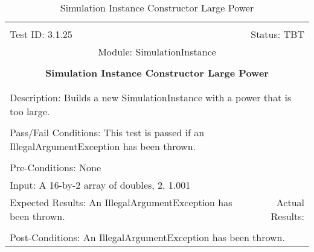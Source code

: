 \documentclass[titlepage]{article}
\begin{document}
\begin{center}%
\begin{table}
\begin{tabular}{|l r|}\hline&\\[-2mm]
	Test ID: 3.1.25	&Status: TBT\\[-3mm]
	\multicolumn{2}{|c|}{Module: SimulationInstance}\\&\\
	\multicolumn{2}{|c|}{\textbf{\large{Simulation Instance Constructor Large Power}}}\\&\\\hline&\\[-3mm]
	\multicolumn{2}{|p{\textwidth}|}{Description: Builds a new SimulationInstance with a power that is too large.}\\[1mm]\hline&\\[-3mm]
	\multicolumn{2}{|p{\textwidth}|}{Pass/Fail Conditions: This test is passed if an IllegalArgumentException has been thrown.}\\[1mm]\hline&\\[-3mm]
	\multicolumn{2}{|p{\textwidth}|}{Pre-Conditions: None}\\[4mm]
	\multicolumn{2}{|p{\textwidth}|}{Input: A 16-by-2 array of doubles, 2, 1.001}\\[2mm]\hline
	\multicolumn{1}{|p{0.49\textwidth}}{Expected Results: An IllegalArgumentException has been thrown.}	&\multicolumn{1}{|p{0.45\textwidth}|}{Actual Results: }\\\hline&\\[-3mm]
	\multicolumn{2}{|p{\textwidth}|}{Post-Conditions: An IllegalArgumentException has been thrown.}\\\hline
\end{tabular}
\caption{Simulation Instance Constructor Large Power}
\end{table}
\end{center}
\end{document}
